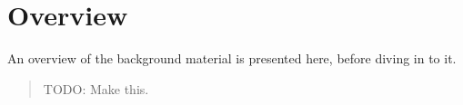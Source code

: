 \section{Overview}



An overview of the background material is presented here, before diving in to it.

\begin{quote}
  TODO: Make this.
\end{quote}
